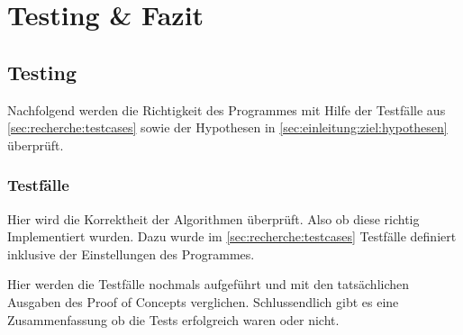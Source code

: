 
\chapter{Testing \& Fazit}
\label{sec:testingfazit}

\section{Testing}
\label{sec:testingfazit:testing}
Nachfolgend werden die Richtigkeit des Programmes mit Hilfe der Testfälle aus \cref{sec:recherche:testcases}  sowie der Hypothesen in \cref{sec:einleitung:ziel:hypothesen}  überprüft.

\subsection{Testfälle}
\label{sec:testingfazit:testing:testcases}
Hier wird die Korrektheit der Algorithmen überprüft. Also ob diese richtig Implementiert wurden. Dazu wurde im \cref{sec:recherche:testcases} Testfälle definiert inklusive der Einstellungen des Programmes.

Hier werden die Testfälle nochmals aufgeführt und mit den tatsächlichen Ausgaben des Proof of Concepts verglichen. Schlussendlich gibt es eine Zusammenfassung ob die Tests erfolgreich waren oder nicht.

